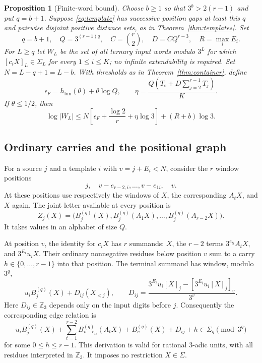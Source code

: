 \documentclass[11pt]{article}
\newtheorem{proposition}[theorem]{Proposition}
\theoremstyle{definition}
\theoremstyle{remark}
\newcommand{\Z}{\mathbb Z}
\newcommand{\hb}{h_{\mathrm{bin}}}
\begin{document}
\begin{proposition}[Finite-word bound]\label{prop:words}
Choose $b\ge1$ so that $3^b>2(r-1)$ and put $q=b+1$.
Suppose \eqref{eq:template} has successive position gaps at least
this $q$ and pairwise disjoint positive distance sets, as in
Theorem~\ref{thm:templates}. Set
\[
 q=b+1,\quad Q=3^{(r-1)q},\quad
 C=\binom r2,\quad D=CQ^{r-3},\quad R=\max_i E_i.
\]
For $L\ge q$ let $W_L$ be the set of all ternary input words modulo
$3^L$ for which
$[c_iX]_L\in\Sigma_L$ for every $1\le i\le K$; no infinite
extendability is required. Set $N=L-q+1=L-b$. With thresholds as in
Theorem~\ref{thm:container}, define
\[
 \epsilon_F=\hb(\theta)+\theta\log Q,
 \qquad \eta=\frac{Q(T_{\mathrm s}+D\sum_{j=2}^{r-1}T_j)}{K}.
\]
If $\theta\le1/2$, then
\begin{equation}\label{eq:finitebound}
 \log|W_L|\le
 N\left[\epsilon_F+\frac{\log2}{r}+\eta\log3\right]
 +(R+b)\log3.
\end{equation}
\end{proposition}

\subsection{Ordinary carries and the positional graph}
For a source $j$ and a template $i$ with $v=j+E_i<N$, consider the
$r$ window positions
\[
 j,\quad v-e_{r-2,i},\ldots,v-e_{1i},\quad v.
\]
At these positions use respectively the windows of $X$, the
corresponding $A_tX$, and $X$ again. The joint letter available at
every position is
\begin{equation}\label{eq:joint}
 Z_j(X)=\bigl(B_j^{(q)}(X),
 B_j^{(q)}(A_1X),\ldots,B_j^{(q)}(A_{r-2}X)\bigr).
\end{equation}
It takes values in an alphabet of size $Q$.

At position $v$, the identity for $c_iX$ has $r$ summands:
$X$, the $r-2$ terms $3^{e_{ti}}A_tX$, and $3^{E_i}u_iX$.
Their ordinary nonnegative residues below position $v$ sum to a
carry $h\in\{0,\ldots,r-1\}$ into that position. The terminal summand
has window, modulo $3^q$,
\[
 u_i B_j^{(q)}(X)+D_{ij}(X_{<j}),\qquad
 D_{ij}=\frac{3^{E_i}u_i[X]_j-[3^{E_i}u_i[X]_j]_v}{3^v}.
\]
Here $D_{ij}\in\Z_3$ depends only on the input digits before $j$.
Consequently the corresponding edge relation is
\begin{equation}\label{eq:carry}
 u_iB_j^{(q)}(X)+\sum_{t=1}^{r-2}B_{v-e_{ti}}^{(q)}(A_tX)
 +B_v^{(q)}(X)+D_{ij}+h\in\Sigma_q\pmod{3^q}
\end{equation}
for some $0\le h\le r-1$. This derivation is valid for rational
$3$-adic units, with all residues interpreted in $\Z_3$.
It imposes no restriction $X\in\Sigma$.
\end{document}
